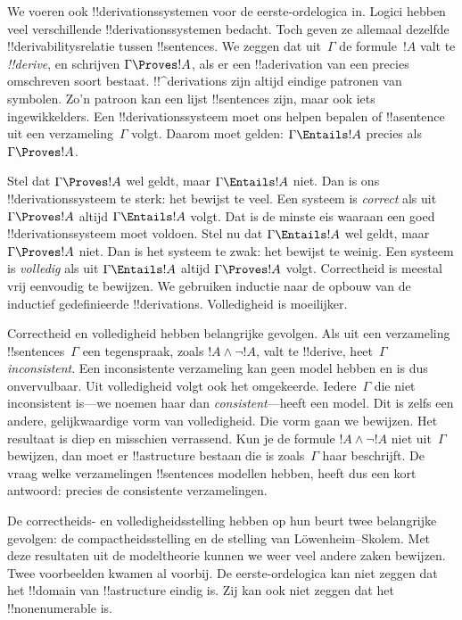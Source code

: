 \documentclass[openany]{memoir}
\begin{document}


We voeren ook !!{derivation}ssystemen voor de eerste-ordelogica in.
Logici hebben veel verschillende !!{derivation}ssystemen bedacht. Toch
geven ze allemaal dezelfde !!{derivability}srelatie tussen
!!{sentence}s. We zeggen dat uit~$\Gamma$ de formule~$!A$ valt te
\emph{!!{derive}}, en schrijven $\Gamma \Proves !A$, als er een
!!a{derivation} van een precies omschreven soort bestaat.
!!^{derivation}s zijn altijd eindige patronen van symbolen. Zo'n
patroon kan een lijst !!{sentence}s zijn, maar ook iets ingewikkelders.
Een !!{derivation}ssysteem moet ons helpen bepalen of !!a{sentence} uit
een verzameling~$\Gamma$ volgt. Daarom moet gelden:
$\Gamma \Entails !A$ precies als $\Gamma \Proves !A$.

Stel dat $\Gamma \Proves !A$ wel geldt, maar $\Gamma \Entails !A$
niet. Dan is ons !!{derivation}ssysteem te sterk: het bewijst te veel.
Een systeem is \emph{correct} als uit $\Gamma \Proves !A$ altijd
$\Gamma \Entails !A$ volgt. Dat is de minste eis waaraan een goed
!!{derivation}ssysteem moet voldoen. Stel nu dat $\Gamma \Entails !A$
wel geldt, maar $\Gamma \Proves !A$ niet. Dan is het systeem te zwak:
het bewijst te weinig. Een systeem is \emph{volledig} als uit
$\Gamma \Entails !A$ altijd $\Gamma \Proves !A$ volgt. Correctheid is
meestal vrij eenvoudig te bewijzen. We gebruiken inductie naar de
opbouw van de inductief gedefinieerde !!{derivation}s. Volledigheid is
moeilijker.

Correctheid en volledigheid hebben belangrijke gevolgen. Als uit een
verzameling !!{sentence}s~$\Gamma$ een tegenspraak, zoals
$!A \land \lnot !A$, valt te !!{derive}, heet~$\Gamma$
\emph{inconsistent}. Een inconsistente verzameling kan geen model
hebben en is dus onvervulbaar. Uit volledigheid volgt ook het omgekeerde.
Iedere~$\Gamma$ die niet inconsistent is---we noemen haar dan
\emph{consistent}---heeft een model. Dit is zelfs een andere,
gelijkwaardige vorm van volledigheid. Die vorm gaan we bewijzen.
Het resultaat is diep en misschien verrassend. Kun je de formule
$!A \land \lnot !A$ niet uit~$\Gamma$ bewijzen, dan moet er
!!a{structure} bestaan die is zoals~$\Gamma$ haar beschrijft. De vraag
welke verzamelingen !!{sentence}s modellen hebben, heeft dus een kort
antwoord: precies de consistente verzamelingen.

De correctheids- en volledigheidsstelling hebben op hun beurt twee
belangrijke gevolgen: de compactheidsstelling en de stelling van
L\"owenheim--Skolem. Met deze resultaten uit de modeltheorie kunnen we
weer veel andere zaken bewijzen. Twee voorbeelden kwamen al voorbij.
De eerste-ordelogica kan niet zeggen dat het !!{domain} van
!!a{structure} eindig is. Zij kan ook niet zeggen dat het
!!{nonenumerable} is.
\end{document}
